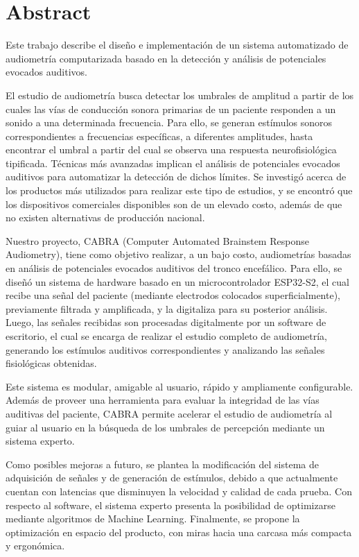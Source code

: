\section{Abstract} \label{abstract}

Este trabajo describe el diseño e implementación de un sistema automatizado de audiometría computarizada basado en la detección y análisis de potenciales evocados auditivos.

El estudio de audiometría busca detectar los umbrales de amplitud a partir de los cuales las vías de conducción sonora primarias de un paciente responden a un sonido a una determinada frecuencia. Para ello, se generan estímulos sonoros correspondientes a frecuencias específicas, a diferentes amplitudes, hasta encontrar el umbral a partir del cual se observa una respuesta neurofisiológica tipificada. Técnicas más avanzadas implican el análisis de potenciales evocados auditivos para automatizar la detección de dichos límites. Se investigó acerca de los productos más utilizados para realizar este tipo de estudios, y se encontró que los dispositivos comerciales disponibles son de un elevado costo, además de que no existen alternativas de producción nacional.

Nuestro proyecto, CABRA (Computer Automated Brainstem Response Audiometry), tiene como objetivo realizar,  a un bajo costo, audiometrías basadas en análisis de potenciales evocados auditivos del tronco encefálico.
Para ello, se diseñó un sistema de hardware basado en un microcontrolador ESP32-S2, el cual recibe una señal del paciente (mediante electrodos colocados superficialmente), previamente filtrada y amplificada, y la digitaliza para su posterior análisis. Luego, las señales recibidas son procesadas digitalmente por un software de escritorio, el cual se encarga de
realizar el estudio completo de audiometría, generando los estímulos auditivos correspondientes y analizando las señales fisiológicas obtenidas.

Este sistema es modular, amigable al usuario, rápido y ampliamente configurable. Además de proveer una herramienta para evaluar la integridad de las vías auditivas del paciente, CABRA permite acelerar el estudio de audiometría al guiar al usuario en la búsqueda de los umbrales de percepción mediante un sistema experto.

Como posibles mejoras a futuro, se plantea la modificación del sistema de adquisición de señales y de generación de estímulos, debido a que actualmente cuentan con latencias que disminuyen la velocidad y calidad de cada prueba. Con respecto al software, el sistema experto presenta la posibilidad de optimizarse mediante algoritmos de Machine Learning. Finalmente, se propone la optimización en espacio del producto, con miras hacia una carcasa más compacta y ergonómica.

